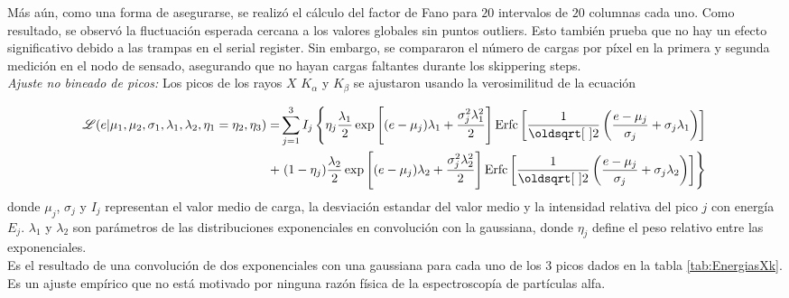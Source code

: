 \indent Más aún, como una forma de asegurarse, se realizó el cálculo del factor de Fano para $20$ intervalos de $20$ columnas cada uno. Como resultado, se observó la fluctuación esperada cercana a los valores globales sin puntos outliers. Esto también prueba que no hay un efecto significativo debido a las trampas en el serial register. Sin embargo, se compararon el número de cargas por píxel en la primera y segunda medición en el nodo de sensado, asegurando que no hayan cargas faltantes durante los skippering steps.\\
\indent \textit{Ajuste no bineado de picos:} Los picos de los rayos $X$ $K_{\alpha}$ y $K_{\beta}$ se ajustaron usando la verosimilitud de la ecuación

\begin{align*}
    \Lagr(e|\mu_{1},
            \mu_{2},
            \sigma_{1},
            \lambda_{1},
            \lambda_{2},
            \eta_{1} = \eta_{2},
            \eta_{3})
    = &
    \sum\limits_{j=1}^{3} I_{j}
    \left\{
        \eta_{j}\frac{\lambda_{1}}{2}
        \exp
            \left[
                (e-\mu_{j})\lambda_{1} + \frac{\sigma_{j}^{2}\lambda_{1}^{2}}{2}
            \right]
        \mbox{Erfc}
        \left[
            \frac{1}{\sqrt{2}}
            \left(
                \frac{e - \mu_{j}}{\sigma_{j}}
                +\sigma_{j}\lambda_{1}
            \right)
        \right] \right.
        \\
        + &
        \left.
        (1-\eta_{j})\frac{\lambda_{2}}{2}
        \exp
            \left[
                 (e - \mu_{j})\lambda_{2}
                 + \frac{\sigma_{j}^{2}\lambda_{2}^{2}}{2}
            \right]
        \mbox{Erfc}
        \left[
            \frac{1}{\sqrt{2}}
            \left(
                \frac{e - \mu_{j}}{\sigma_{j}}
                +\sigma_{j}\lambda_{2}
            \right)
        \right]
    \right\}
\end{align*}
donde $\mu_{j}$, $\sigma_{j}$ y $I_{j}$ representan el valor medio de carga, la desviación estandar del valor medio y la intensidad relativa del pico $j$ con energía $E_{j}$. $\lambda_{1}$ y $\lambda_{2}$ son parámetros de las distribuciones exponenciales en convolución con la gaussiana, donde $\eta_{j}$ define el peso relativo entre las exponenciales.\\
\indent Es el resultado de una convolución de dos exponenciales con una gaussiana para cada uno de los $3$ picos dados en la tabla \ref{tab:EnergiasXk}. Es un ajuste empírico que no está motivado por ninguna razón física de la espectroscopía de partículas alfa.\\
